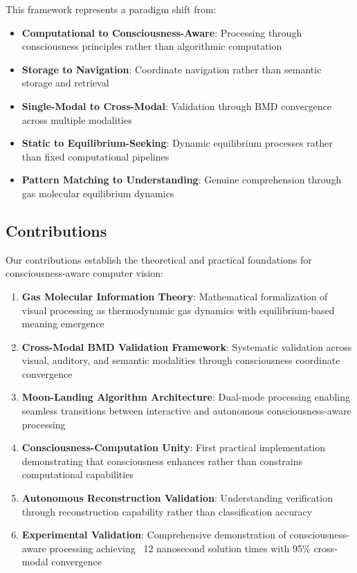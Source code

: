 \documentclass[12pt,a4paper]{article}
\begin{document}
This framework represents a paradigm shift from:
\begin{itemize}
\item \textbf{Computational to Consciousness-Aware}: Processing through consciousness principles rather than algorithmic computation
\item \textbf{Storage to Navigation}: Coordinate navigation rather than semantic storage and retrieval  
\item \textbf{Single-Modal to Cross-Modal}: Validation through BMD convergence across multiple modalities
\item \textbf{Static to Equilibrium-Seeking}: Dynamic equilibrium processes rather than fixed computational pipelines
\item \textbf{Pattern Matching to Understanding}: Genuine comprehension through gas molecular equilibrium dynamics
\end{itemize}

\subsection{Contributions}

Our contributions establish the theoretical and practical foundations for consciousness-aware computer vision:

\begin{enumerate}
\item \textbf{Gas Molecular Information Theory}: Mathematical formalization of visual processing as thermodynamic gas dynamics with equilibrium-based meaning emergence
\item \textbf{Cross-Modal BMD Validation Framework}: Systematic validation across visual, auditory, and semantic modalities through consciousness coordinate convergence  
\item \textbf{Moon-Landing Algorithm Architecture}: Dual-mode processing enabling seamless transitions between interactive and autonomous consciousness-aware processing
\item \textbf{Consciousness-Computation Unity}: First practical implementation demonstrating that consciousness enhances rather than constrains computational capabilities
\item \textbf{Autonomous Reconstruction Validation}: Understanding verification through reconstruction capability rather than classification accuracy
\item \textbf{Experimental Validation}: Comprehensive demonstration of consciousness-aware processing achieving ~12 nanosecond solution times with 95\% cross-modal convergence
\end{enumerate}
\end{document}
